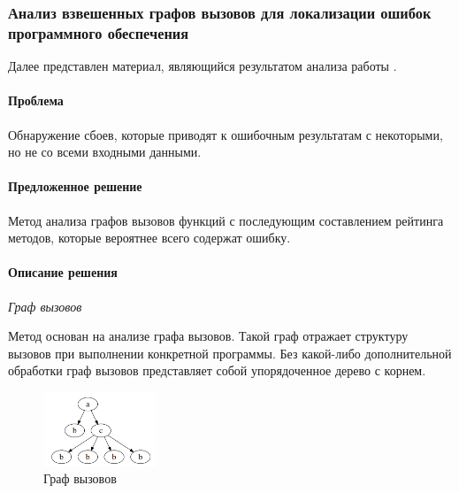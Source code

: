 \def\notedate{2021.11.10}
\def\currentauthor{Крехтунова Д.Д. (РК6-73Б)}

\subsubsection{Анализ взвешенных графов вызовов для локализации ошибок программного обеспечения}

Далее представлен материал, являющийся результатом анализа работы \cite{Eichinger2008}.

\paragraph{Проблема}

Обнаружение сбоев, которые приводят к ошибочным результатам с некоторыми, но не со всеми входными данными.

\paragraph{Предложенное решение}

Метод анализа графов вызовов функций с последующим составлением рейтинга методов, которые вероятнее всего содержат ошибку. 

\paragraph{Описание решения}

\textit{Граф вызовов}

Метод основан на анализе графа вызовов. Такой граф отражает структуру вызовов при выполнении конкретной программы. Без какой-либо дополнительной обработки граф вызовов представляет собой упорядоченное дерево с корнем.

\begin{figure}[!ht]
	\centering
	\includegraphics[width=0.3\textwidth]{ResearchNotes/rndhpc_not_dbg_2021_11_10/graph.png}
	\caption{Граф вызовов} 
\end{figure}

